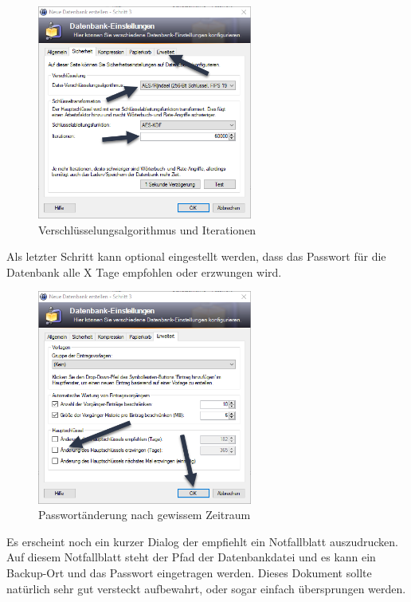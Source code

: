 \documentclass[12pt,a4paper]{scrreprt}
\begin{document}
\begin{figure}[h]
\begin{center}
\includegraphics[width=200pt]{media/knewdb4.png}
\caption{Verschlüsselungsalgorithmus und Iterationen}
\label{knewdb4}
\end{center}
\end{figure}

\noindent Als letzter Schritt kann optional eingestellt werden, dass das Passwort für die Datenbank alle X Tage empfohlen oder erzwungen wird.

\begin{figure}[h]
\begin{center}
\includegraphics[width=200pt]{media/knewdb5.png}
\caption{Passwortänderung nach gewissem Zeitraum}
\label{knewdb5}
\end{center}
\end{figure}

\newpage

\noindent  Es erscheint noch ein kurzer Dialog der empfiehlt ein Notfallblatt auszudrucken. Auf diesem Notfallblatt steht der Pfad der Datenbankdatei und es kann ein Backup-Ort und das Passwort eingetragen werden. Dieses Dokument sollte natürlich sehr gut versteckt aufbewahrt, oder sogar einfach übersprungen werden.
\end{document}
